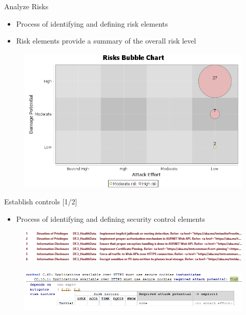 \documentclass[xcolor=table]{beamer}
\begin{document}
\begin{frame}{Analyze Risks}
\begin{itemize}
    \item Process of identifying and defining risk elements
    \item Risk elements provide a summary of the overall risk level
\end{itemize}
 \begin{figure}[H]
  \includegraphics[width=0.8\linewidth]{img/risksBubbleChart.png}
  \label{fig:bubblechart1}
\end{figure}
\end{frame}


\begin{frame}{Establish controls [1/2]}
\begin{itemize}
    \item Process of identifying and defining security control elements
\end{itemize}
 \begin{figure}[H]
  \includegraphics[width=\linewidth]{img/mtmt_controls.PNG}
  \label{fig:mtmtcontrols}
\end{figure}
 \begin{figure}[H]
  \includegraphics[width=\linewidth]{img/control.PNG}
  \label{fig:control}
\end{figure}
\end{frame}
\end{document}
